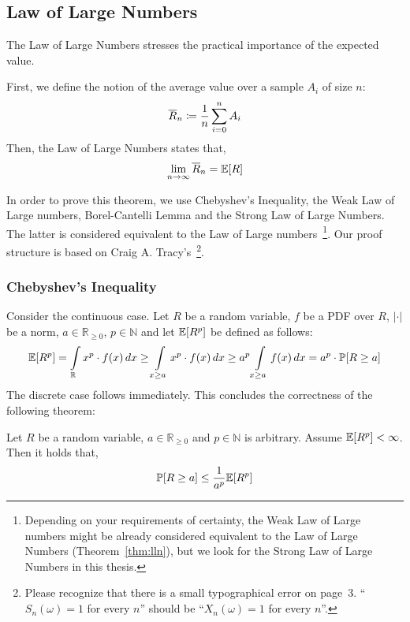 \subsection{Law of Large Numbers}
\label{sec:bp-lln}
%
The Law of Large Numbers stresses the practical importance of the expected value.
\begin{theorem}\label{thm:lln}
  First, we define the notion of the average value over a sample $A_i$ of size $n$:
  \[ \overline{R}_n \coloneqq \frac1n \sum_{i=0}^n A_i \]
  Then, the Law of Large Numbers states that,
  \[ \lim_{n\to\infty} \overline{R}_n = \mathbb E[R] \]
\end{theorem}

In order to prove this theorem, we use Chebyshev's Inequality, the Weak Law of Large numbers,
Borel-Cantelli Lemma and the Strong Law of Large Numbers. The latter is considered equivalent
to the Law of Large numbers~\footnote{
  Depending on your requirements of certainty, the Weak Law of Large numbers might be already
  considered equivalent to the Law of Large Numbers (Theorem~\ref{thm:lln}), but we look
  for the Strong Law of Large Numbers in this thesis.
}. Our proof structure is based on Craig A. Tracy's~\cite{cnfgen}\footnote{
  Please recognize that there is a small typographical error on page~3.
  \enquote{$S_n(\omega) = 1$ for every $n$} should be \enquote{$X_n(\omega) = 1$ for every $n$}.
}.

\subsubsection{Chebyshev's Inequality}
\label{sec:bp-chebyshev}
%
Consider the continuous case.
Let $R$ be a random variable, $f$ be a PDF over $R$, $|\cdot|$ be a norm,
$a \in \mathbb R_{\geq 0}$, $p \in \mathbb N$ and let $\mathbb E[R^p]$ be defined as follows:
\begin{align*}
  \mathbb E[R^p]
          = \int\limits_{\mathbb R} x^p \cdot f(x) \, dx 
          \geq \int\limits_{x \geq a} x^p \cdot f(x) \, dx 
          \geq a^p \int\limits_{x \geq a} f(x) \, dx 
          = a^p \cdot \mathbb P[R \geq a]
\end{align*}
The discrete case follows immediately.
This concludes the correctness of the following theorem:
\begin{theorem}\label{thm:chebyshev}
  Let $R$ be a random variable, $a \in \mathbb R_{\geq 0}$ and $p \in \mathbb N$ is arbitrary.
  Assume $\mathbb E[R^p] < \infty$.
  Then it holds that,
  \[ \mathbb P[R \geq a] \leq \frac{1}{a^p} \mathbb E[R^p] \]
\end{theorem}

